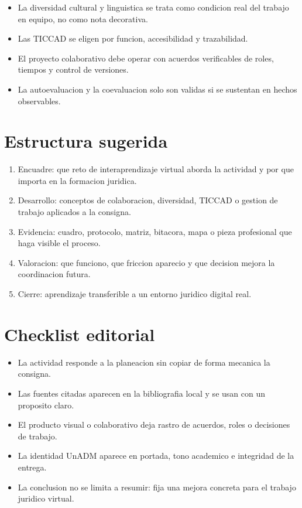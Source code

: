 \documentclass[
  spanish,
  letterpaper, oneside
]{article}
\begin{document}
\begin{itemize}
  \item La diversidad cultural y linguistica se trata como condicion real del trabajo en equipo, no como nota decorativa.
  \item Las TICCAD se eligen por funcion, accesibilidad y trazabilidad.
  \item El proyecto colaborativo debe operar con acuerdos verificables de roles, tiempos y control de versiones.
  \item La autoevaluacion y la coevaluacion solo son validas si se sustentan en hechos observables.
\end{itemize}

\section{Estructura sugerida}

\begin{enumerate}
  \item Encuadre: que reto de interaprendizaje virtual aborda la actividad y por que importa en la formacion juridica.
  \item Desarrollo: conceptos de colaboracion, diversidad, TICCAD o gestion de trabajo aplicados a la consigna.
  \item Evidencia: cuadro, protocolo, matriz, bitacora, mapa o pieza profesional que haga visible el proceso.
  \item Valoracion: que funciono, que friccion aparecio y que decision mejora la coordinacion futura.
  \item Cierre: aprendizaje transferible a un entorno juridico digital real.
\end{enumerate}

\section{Checklist editorial}

\begin{itemize}
  \item La actividad responde a la planeacion sin copiar de forma mecanica la consigna.
  \item Las fuentes citadas aparecen en la bibliografia local y se usan con un proposito claro.
  \item El producto visual o colaborativo deja rastro de acuerdos, roles o decisiones de trabajo.
  \item La identidad UnADM aparece en portada, tono academico e integridad de la entrega.
  \item La conclusion no se limita a resumir: fija una mejora concreta para el trabajo juridico virtual.
\end{itemize}
\end{document}
